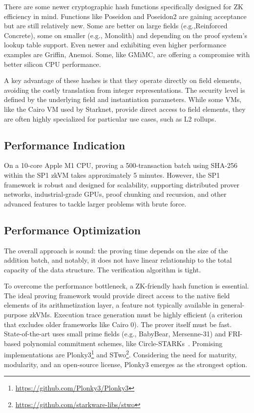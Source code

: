 \documentclass[twocolumn]{article}
\begin{document}
There are some newer cryptographic hash functions specifically designed for ZK efficiency in mind. Functions like Poseidon and Poseidon2 are gaining acceptance but are still relatively new. Some are better on large fields (e.g.,Reinforced Concrete), some on smaller (e.g., Monolith) and depending on the proof system's lookup table support. Even newer and exhibiting even higher performance examples are Griffin, Anemoi. Some, like GMiMC, are offering a compromise with better silicon CPU performance.

A key advantage of these hashes is that they operate directly on field elements, avoiding the costly translation from integer representations. The security level is defined by the underlying field and instantiation parameters. While some VMs, like the Cairo VM used by Starknet, provide direct access to field elements, they are often highly specialized for particular use cases, such as L2 rollups.

\subsection{Performance Indication}

On a 10-core Apple M1 CPU, proving a 500-transaction batch using SHA-256 within the SP1 zkVM takes approximately 5 minutes. However, the SP1 framework is robust and designed for scalability, supporting distributed prover networks, industrial-grade GPUs, proof chunking and recursion, and other advanced features to tackle larger problems with brute force.

\subsection{Performance Optimization}

The overall approach is sound: the proving time depends on the size of the addition batch, and notably, it does not have linear relationship to the total capacity of the data structure. The verification algorithm is tight.

To overcome the performance bottleneck, a ZK-friendly hash function is essential. The ideal proving framework would provide direct access to the native field elements of its arithmetization layer, a feature not typically available in general-purpose zkVMs. Execution trace generation must be highly efficient (a criterion that excludes older frameworks like Cairo 0). The prover itself must be fast. State-of-the-art uses small prime fields (e.g., BabyBear, Mersenne-31) and FRI-based polynomial commitment schemes, like Circle-STARKs~\cite{cryptoeprint:2024/278}. Promising implementations are Plonky3\footnote{\url{https://github.com/Plonky3/Plonky3}} and STwo\footnote{\url{https://github.com/starkware-libs/stwo}}. Considering the need for maturity, modularity, and an open-source license, Plonky3 emerges as the strongest option.
\end{document}
